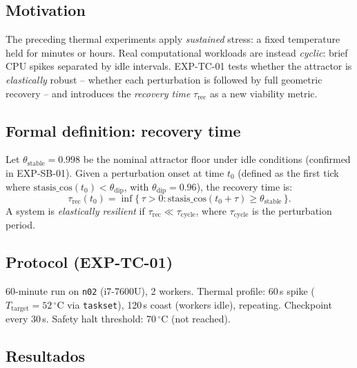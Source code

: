\documentclass[11pt, a4paper]{article}
\begin{document}
\subsection{Motivation}

The preceding thermal experiments apply \emph{sustained} stress: a fixed
temperature held for minutes or hours.  Real computational workloads are
instead \emph{cyclic}: brief CPU spikes separated by idle intervals.
EXP-TC-01 tests whether the attractor is \emph{elastically} robust -- whether
each perturbation is followed by full geometric recovery -- and introduces
the \emph{recovery time} $\tau_\text{rec}$ as a new viability metric.

\subsection{Formal definition: recovery time}

Let $\theta_\text{stable} = 0.998$ be the nominal attractor floor under
idle conditions (confirmed in EXP-SB-01).  Given a perturbation onset at
time $t_0$ (defined as the first tick where
$\text{stasis\_cos}(t_0) < \theta_\text{dip}$, with $\theta_\text{dip} =
0.96$), the recovery time is:
\begin{equation}
  \tau_\text{rec}(t_0) = \inf\{\,\tau > 0 :
    \text{stasis\_cos}(t_0 + \tau) \geq \theta_\text{stable}\,\}.
  \label{eq:tau_rec}
\end{equation}
A system is \emph{elastically resilient} if $\tau_\text{rec} \ll
\tau_\text{cycle}$, where $\tau_\text{cycle}$ is the perturbation period.

\subsection{Protocol (EXP-TC-01)}

60-minute run on \texttt{n02} (i7-7600U), 2 workers.  Thermal profile:
60\,s spike ($T_\text{target}=52\,^\circ$C via \texttt{taskset}), 120\,s
coast (workers idle), repeating.  Checkpoint every 30\,s.
Safety halt threshold: 70\,$^\circ$C (not reached).

\subsection{Resultados}
\end{document}
